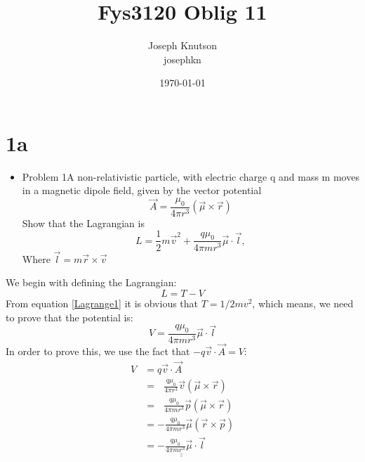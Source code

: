\documentclass{report}
\title{Fys3120 Oblig 11} %
\author{Joseph Knutson\\josephkn}
\date{\today} %
\begin{document}
\maketitle



\section*{1a}
\begin{itemize}
\item
Problem 1A non-relativistic particle, with electric charge q and mass
m moves in a magnetic dipole field, given by the vector potential
\begin{equation}
\vec{A} = \frac{\mu_0}{4\pi r^3}(\vec{\mu}\times\vec{r}) 
\end{equation}
Show that the Lagrangian is
\begin{equation}\label{Lagrange1}
L = \frac{1}{2}m\vec{v}^2 + \frac{q\mu_0}{4\pi mr^3}\vec{\mu}\cdot\vec{l},
\end{equation}
Where $\vec{l} = m\vec{r} \times \vec{v}$
\end{itemize}

We begin with defining the Lagrangian:
$$L = T-V$$
From equation \ref{Lagrange1} it is obvious that $T=1/2mv^2$, which means, we need to prove that the potential is: 
$$V =   \frac{q\mu_0}{4\pi mr^3}\vec{\mu}\cdot\vec{l}$$
In order to prove this, we use the fact that $- q\vec{v} \cdot \vec{A} = V$:
\begin{align}
V &=  q\vec{v} \cdot \vec{A} \nonumber\\
&=\ \ \  \frac{q\mu_0}{4\pi r^3}\vec{v}(\vec{\mu}\times\vec{r})\nonumber\\
&=\ \ \  \frac{q\mu_0}{4\pi m r^3}\vec{p}(\vec{\mu}\times\vec{r})\nonumber\\
&=-\frac{q\mu_0}{4\pi m r^3}\vec{\mu}(\vec{r}\times\vec{p})\nonumber\\
&=\underline{\underline{-\frac{q\mu_0}{4\pi m r^3}\vec{\mu}\cdot\vec{l}}}\label{pot}\\\nonumber
\end{align}
\clearpage
\end{document}
